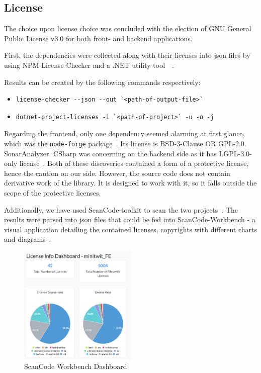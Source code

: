 \subsection{License}

The choice upon license choice was concluded with the election of GNU General Public License v3.0 for both front- and backend applications.

First, the dependencies were collected along with their licenses into json files by using NPM License Checker and  a .NET utility tool~\cite{NPMLicenseChecker}~\cite{nugetLicense}.

Results can be created by the following commands respectively:

\begin{itemize}[noitemsep]
    \item 
\begin{verbatim}
license-checker --json --out `<path-of-output-file>`
\end{verbatim}

    \item 
\begin{verbatim}
dotnet-project-licenses -i `<path-of-project>` -u -o -j
\end{verbatim}

\end{itemize}

Regarding the frontend, only one dependency seemed alarming at first glance, which was the \texttt{node-forge} package~\cite{nodeForge}. Its license is BSD-3-Clause OR GPL-2.0. SonarAnalyzer. CSharp was concerning on the backend side as it has LGPL-3.0-only license~\cite{sonarlint}. Both of these discoveries contained a form of a protective license, hence the caution on our side. However, the source code does not contain derivative work of the library. It is designed to work with it, so it falls outside the scope of the protective licenses.
\vspace{3mm}

Additionally, we have used ScanCode-toolkit to scan the two projects~\cite{scanCodeToolkit}. The results were parsed into json files that could be fed into ScanCode-Workbench - a visual application detailing the contained licenses, copyrights with different charts and diagrams~\cite{scanCodeWorkbench}.

\begin{figure}[h]
    \centering
    \includegraphics[width=0.5\textwidth]{images/license/scancode_workbench_fe_results.png}
    \caption{ScanCode Workbench Dashboard}
    \label{fig:license}
\end{figure}

